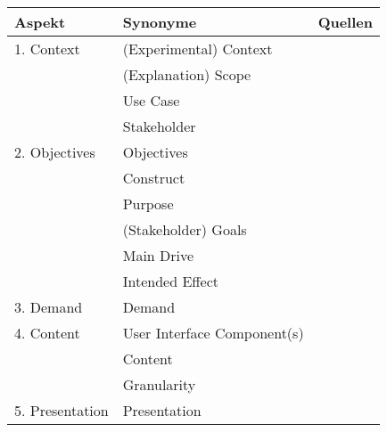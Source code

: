 \begin{table}
    \begin{tabular}{|p{}|p{}|p{}|}
        \hline
        \textbf{Aspekt}          & \textbf{Synonyme} & \textbf{Quellen} \\ \hline
        1. Context      & (Experimental) Context & \cite{chazette_knowledge_nodate} \cite{chazette_end-users_nodate} \cite{sato_context_nodate} \cite{waa_evaluating_2021} \cite{kohl_explainability_2019} \cite{neerincx_using_2018} \cite{sovrano_modelling_2020} \cite{doshi2017towards} \\
                        & (Explanation) Scope & \cite{wohlin2012experimentation} \cite{eiband_impact_2019} \cite{doshi2017towards} \\
                        & Use Case & \cite{waa_evaluating_2021} \\
                        & Stakeholder & \cite{rosenfeld_explainability_2019} \\
        \hline
        2. Objectives   & Objectives & \cite{nunes_systematic_2017} \\
                        & Construct & \cite{waa_evaluating_2021} \\
                        & Purpose & \cite{nunes_systematic_2017} \cite{wohlin2012experimentation} \\
                        & (Stakeholder) Goals & \cite{cirqueira_scenario-based_2020} \cite{sovrano_modelling_2020} \cite{ribera2019can} \\
                        & Main Drive & \cite{anjomshoae2019explainable} \\
                        & Intended Effect & \cite{balog_measuring_2020} \\
        \hline
        3. Demand          & Demand            & \cite{chazette_knowledge_nodate} \\
        \hline
        4. Content         & User Interface Component(s) & \cite{nunes_systematic_2017}
                                                        \cite{rosenfeld_explainability_2019} \\
                        & Content               & \cite{ribera2019can} \\
                        & Granularity           & \cite{chazette_knowledge_nodate}
                                                  \cite{kohl_explainability_2019} \\
        \hline
        5. Presentation    & Presentation          & \cite{rosenfeld_explainability_2019,kouki_user_2017} \\

\end{tabular}
\end{table}
